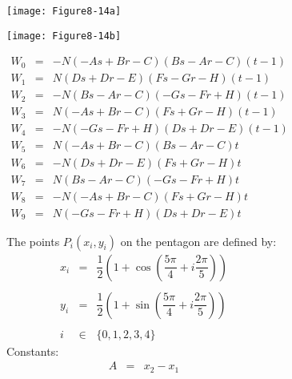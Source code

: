 \begin{figure}[!htb]
	\centering
	\begin{subfigure}{0.48\linewidth}
		\centering
		\texttt{[image: Figure8-14a]}
		\caption*{}
	\end{subfigure}
	\hfill
	\begin{subfigure}{0.48\linewidth}
		\centering
		\texttt{[image: Figure8-14b]}
		\caption*{}
	\end{subfigure}
	\hfill
	\begin{subfigure}{0.48\linewidth}
		\centering
		\begin{equation*}
		\begin{array}{lll}
		W_0 &=& -N(-As + Br - C)(Bs-Ar-C)(t - 1) \\
		W_1 &=& N(Ds+Dr-E)(Fs-Gr-H)(t-1) \\
		W_2 &=& -N(Bs -Ar -C)(-Gs-Fr+H)(t - 1)\\
		W_3 &=& N(-As + Br -C)(Fs + Gr - H)(t - 1) \\
		W_4 &=& -N(-Gs - Fr + H)(Ds + Dr - E)(t - 1) \\
		W_5 &=& N(-As +Br - C)(Bs -Ar -C)t \\
		W_6 &=& -N(Ds + Dr - E)(Fs + Gr - H)t\\
		W_7 &=& N(Bs - Ar -C)(-Gs -Fr + H)t \\
		W_8 &=& -N(-As + Br -C)(Fs + Gr - H)t \\
		W_9 &=& N(-Gs - Fr + H)(Ds + Dr -E)t
		\end{array}
		\end{equation*}
	\end{subfigure}%
	\hfill
	\begin{subfigure}{0.48\linewidth}
		\centering
		The points $P_i(x_i, y_i)$ on the pentagon are defined by:
		\begin{equation*}
		\begin{array}{lll}
		x_i &=& \dfrac{1}{2}\left(1 +\cos\left(\dfrac{5\pi}{4} + i \dfrac{2\pi}{5}\right)\right) \\ \\
		y_i &=& \dfrac{1}{2}\left(1 +\sin\left(\dfrac{5\pi}{4} + i \dfrac{2\pi}{5}\right)\right) \\ \\
		i &\in& \lbrace 0, 1, 2, 3, 4 \rbrace
		\end{array}
		\end{equation*}
		Constants:
		\begin{equation*}
		\begin{array}{lll}
		A &=& x_2 - x_1 \\

\end{array}
\end{equation*}
\end{subfigure}
\end{figure}

